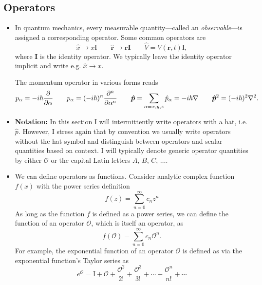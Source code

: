\documentclass[11pt, a4paper]{article}
\renewcommand{\grad}{\nabla}
\renewcommand{\vec}[1]{\bm{#1}} %
\newcommand{\mat}[1]{\mathbf{#1}} %
\renewcommand{\r}{\vec{r}}  %
\renewcommand{\O}{\mathcal{O}}  %
\begin{document}
\subsection{Operators}
\begin{itemize}
	\item In quantum mechanics, every measurable quantity---called an \textit{observable}---is assigned a corresponding operator. Some common operators are
	\begin{equation*}
		\hat{x} \to x \mathrm{I} \qquad \hat{\r} \to \r \mat{I} \qquad \hat{V} = V(\r, t)\mathrm{I},
	\end{equation*}
	where $ \mat{I} $ is the identity operator. We typically leave the identity operator implicit and write e.g. $ \hat{x} \to x $. 
	
	The momentum operator in various forms reads
	\begin{equation*}
		p_{\alpha} = -i\hbar \pdv{}{\alpha} \qquad p_{\alpha} = (-i\hbar)^{n} \pdv[n]{}{\alpha} \qquad \vec{\hat{p}} = \sum_{\alpha = x, y, z} \hat{p}_{\alpha} = - i \hbar \grad \qquad \vec{\hat{p}}^{2} = (-i\hbar)^{2} \laplacian.
	\end{equation*}
	
	\item \textbf{Notation:} In this section I will intermittently write operators with a hat, i.e. $ \hat{p} $. However, I stress again that by convention we usually write operators without the hat symbol and distinguish between operators and scalar quantities based on context. I will typically denote generic operator quantities by either $ \O $ or the capital Latin letters $ A $, $ B $, $ C $, $ \ldots  $.
	
	\item We can define operators as functions. Consider analytic complex function $ f(x) $ with the power series definition
	\begin{equation*}
		f(z) = \sum_{n=0}^{\infty}c_{n}z^{n}
	\end{equation*}
	As long as the function $ f $ is defined as a power series, we can define the function of an operator $ \O $, which is itself an operator, as
	\begin{equation*}
		f(\O) = \sum_{n = 0}^{\infty}c_{n} \O^{n}.	
	\end{equation*}
	For example, the exponential function of an operator $ \O $ is defined as via the exponential function's Taylor series as
	\begin{equation*}
		e^{\O} = \mathrm{I} + \O + \frac{\O^{2}}{2!} + \frac{\O^{3}}{3!} + \cdots + \frac{\O^{n}}{n!} + \cdots 
	\end{equation*}
	

\end{itemize}
\end{document}
